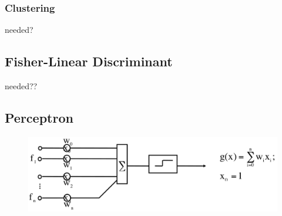 \subsubsection{Clustering}
\label{sssect:clustering}
needed?

\subsection{Fisher-Linear Discriminant}
needed??

\subsection{Perceptron}
\label{ssect:perceptron}
\begin{figure}[h]
\includegraphics[scale=0.4]{perceptron}
\end{figure}
\newpage